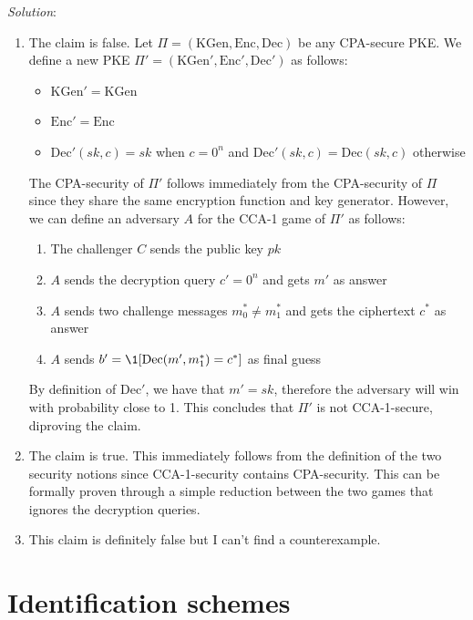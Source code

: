 \documentclass[a4paper, 12pt]{report}
\begin{document}
    \textit{Solution}:
    \begin{enumerate}
        \item The claim is false. Let $\Pi = (\mathrm{KGen}, \mathrm{Enc}, \mathrm{Dec})$ be any CPA-secure PKE. We define a new PKE $\Pi' = (\mathrm{KGen}', \mathrm{Enc}', \mathrm{Dec}')$ as follows:
        \begin{itemize}
            \item $\mathrm{KGen}' = \mathrm{KGen}$
            \item $\mathrm{Enc}' = \mathrm{Enc}$
            \item $\mathrm{Dec}'(sk, c) = sk$ when $c = 0^n$ and $\mathrm{Dec}'(sk, c) = \mathrm{Dec}(sk, c)$ otherwise
        \end{itemize}

        The CPA-security of $\Pi'$ follows immediately from the CPA-security of $\Pi$ since they share the same encryption function and key generator. However, we can define an adversary $A$ for the CCA-1 game of $\Pi'$ as follows:
        \begin{enumerate}
            \item The challenger $C$ sends the public key $pk$
            \item $A$ sends the decryption query $c' = 0^n$ and gets $m'$ as answer
            \item $A$ sends two challenge messages $m_0^* \neq m_1^*$ and gets the ciphertext $c^*$ as answer
            \item $A$ sends $b' = \1[\mathrm{Dec}(m', m_1^*) = c^*]$ as final guess
        \end{enumerate} 

        By definition of $\mathrm{Dec}'$, we have that $m' = sk$, therefore the adversary will win with probability close to 1. This concludes that $\Pi'$ is not CCA-1-secure, diproving the claim.

        \item The claim is true. This immediately follows from the definition of the two security notions since CCA-1-security contains CPA-security. This can be formally proven through a simple reduction between the two games that ignores the decryption queries.
        
        \item This claim is definitely false but I can't find a counterexample. 

    \end{enumerate}
    
    \chapter{Identification schemes}
\end{document}
